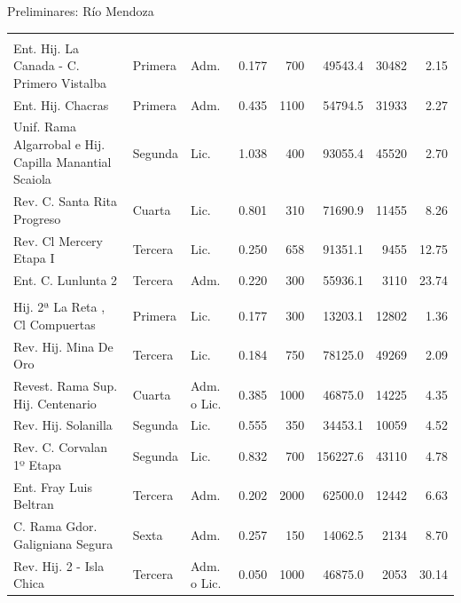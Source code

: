 \documentclass{beamer}\usepackage[]{graphicx}\usepackage[]{color}
\begin{document}
\begin{frame}{Preliminares: Río Mendoza}
\begin{table}[H]
{\begin{threeparttable}
\begin{tabular}{lllrrrrr}
\addlinespace[0.3em]
\multicolumn{8}{l}{\textbf{2019}}\\
\hspace{1em}Ent. Hij. La Canada - C. Primero Vistalba & Primera & Adm. & 0.177 & 700 & 49543.4 & 30482 & 2.15\\
\hspace{1em}Ent. Hij. Chacras & Primera & Adm. & 0.435 & 1100 & 54794.5 & 31933 & 2.27\\
\hspace{1em}Unif. Rama Algarrobal e Hij. Capilla Manantial Scaiola & Segunda & Lic. & 1.038 & 400 & 93055.4 & 45520 & 2.70\\
\hspace{1em}Rev. C. Santa Rita Progreso & Cuarta & Lic. & 0.801 & 310 & 71690.9 & 11455 & 8.26\\
\hspace{1em}Rev. Cl Mercery Etapa I & Tercera & Lic. & 0.250 & 658 & 91351.1 & 9455 & 12.75\\
\hspace{1em}Ent. C. Lunlunta 2 & Tercera & Adm. & 0.220 & 300 & 55936.1 & 3110 & 23.74\\
\addlinespace[0.3em]
\multicolumn{8}{l}{\textbf{2020}}\\
\hspace{1em}Hij. 2ª La Reta , Cl Compuertas & Primera & Lic. & 0.177 & 300 & 13203.1 & 12802 & 1.36\\
\hspace{1em}Rev. Hij. Mina De Oro & Tercera & Lic. & 0.184 & 750 & 78125.0 & 49269 & 2.09\\
\hspace{1em}Revest. Rama Sup. Hij. Centenario & Cuarta & Adm. o Lic. & 0.385 & 1000 & 46875.0 & 14225 & 4.35\\
\hspace{1em}Rev. Hij. Solanilla & Segunda & Lic. & 0.555 & 350 & 34453.1 & 10059 & 4.52\\
\hspace{1em}Rev. C. Corvalan 1º Etapa & Segunda & Lic. & 0.832 & 700 & 156227.6 & 43110 & 4.78\\
\hspace{1em}Ent. Fray Luis Beltran & Tercera & Adm. & 0.202 & 2000 & 62500.0 & 12442 & 6.63\\
\hspace{1em}C. Rama Gdor. Galigniana Segura & Sexta & Adm. & 0.257 & 150 & 14062.5 & 2134 & 8.70\\
\hspace{1em}Rev. Hij. 2 - Isla Chica & Tercera & Adm. o Lic. & 0.050 & 1000 & 46875.0 & 2053 & 30.14\\

\end{tabular}
\end{threeparttable}}
\end{table}
\end{frame}
\end{document}
